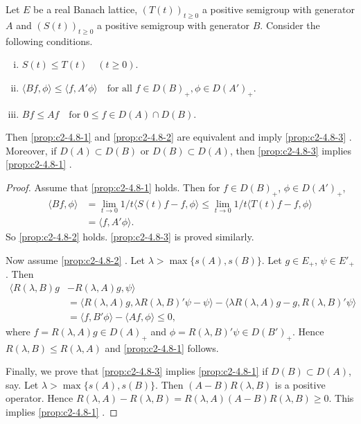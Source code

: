 \begin{proposition}\label{prop:c2-4.8}
Let $E$ be a real Banach lattice, $(T(t))_{t \geq 0}$ a
positive semigroup with generator $A$ and $(S(t))_{t \geq 0}$ a positive
semigroup with generator $B$. Consider the following conditions.
\begin{enumerate}[(i)]
\item \label{prop:c2-4.8-1}
$S(t) \leq T(t) \quad (t \geq 0)$.
\item \label{prop:c2-4.8-2}
$\langle Bf,\phi\rangle \leq \langle f,A'\phi\rangle \quad \text{for all } f \in D(B)_{+}, \phi \in D(A')_{+}$.
\item \label{prop:c2-4.8-3}
$Bf \leq Af \quad \text{for } 0 \leq f \in D(A) \cap D(B)$.
\end{enumerate}
Then \ref{prop:c2-4.8-1} and \ref{prop:c2-4.8-2}  are equivalent and imply \ref{prop:c2-4.8-3}  .
Moreover, if $D(A) \subset D(B)$ or $D(B) \subset D(A)$, then \ref{prop:c2-4.8-3}   implies \ref{prop:c2-4.8-1}  .
\end{proposition}

\begin{proof}
Assume that \ref{prop:c2-4.8-1}   holds. 
Then for $f \in D(B)_{+}$, $\phi \in D(A')_{+}$,
\begin{align*}
\langle Bf,\phi\rangle &= \lim_{t \to 0} 1/t \langle S(t)f - f, \phi\rangle \leq \lim_{t \to 0} 1/t \langle T(t)f - f, \phi\rangle\\
&= \langle f, A'\phi\rangle.
\end{align*}
So \ref{prop:c2-4.8-2}   holds. 
\ref{prop:c2-4.8-3}   is proved similarly.

Now assume \ref{prop:c2-4.8-2}  . 
Let $\lambda > \max \{s(A), s(B)\}$. Let $g \in E_{+}$, $\psi \in E'_{+}$.
Then 
\begin{align*}
\langle R(\lambda,B)g &- R(\lambda,A)g, \psi\rangle\\
&= \langle R(\lambda,A)g, \lambda R(\lambda,B)'\psi - \psi\rangle - \langle \lambda R(\lambda,A)g - g, R(\lambda,B)'\psi\rangle\\
&= \langle f, B'\phi\rangle - \langle Af, \phi\rangle \leq 0,
\end{align*}
where $f = R(\lambda,A)g \in D(A)_{+}$ and $\phi = R(\lambda,B)'\psi \in D(B')_{+}$. 
Hence $R(\lambda,B) \leq R(\lambda,A)$ and \ref{prop:c2-4.8-1}   follows.

Finally, we prove that \ref{prop:c2-4.8-3}   implies  \ref{prop:c2-4.8-1}   if $D(B) \subset D(A)$, say.
Let $\lambda > \max\{s(A),s(B)\}$. 
Then $(A - B)R(\lambda,B)$ is a positive operator.
Hence $R(\lambda,A) - R(\lambda,B) = R(\lambda,A)(A - B)R(\lambda,B) \geq 0$. 
This implies \ref{prop:c2-4.8-1}  .
\end{proof}

